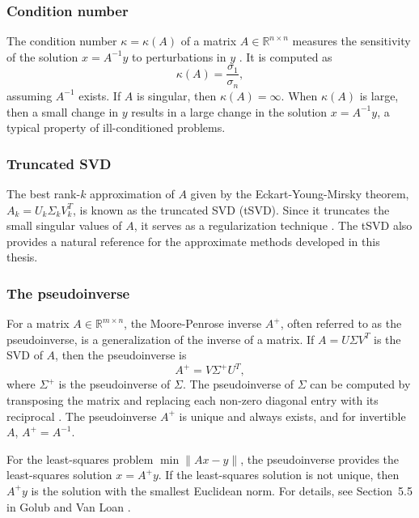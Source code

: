 \subsubsection{Condition number}\label{sec:condition_number}
The condition number $\kappa = \kappa(A)$ of a matrix $A \in \mathbb{R}^{n \times n}$ measures the sensitivity of the solution $x = A^{-1} y$ to perturbations in $y$ \cite{hansen2010discrete}. It is computed as
\begin{equation*}
    \kappa(A) =
    \frac{\sigma_1}{\sigma_n},
\end{equation*}
assuming $A^{-1}$ exists. If $A$ is singular, then $\kappa(A) = \infty$. When $\kappa(A)$ is large, then a small change in $y$ results in a large change in the solution $x = A^{-1} y$, a typical property of ill-conditioned problems.
%


\subsubsection{Truncated SVD}\label{sec:tsvd}
The best rank-$k$ approximation of $A$ given by the Eckart-Young-Mirsky theorem, $A_k = U_k \Sigma_k V_k^T$, is known as the truncated SVD (tSVD). Since it truncates the small singular values of $A$, it serves as a regularization technique \cite{hansen2010discrete}. The tSVD also provides a natural reference for the approximate methods developed in this thesis.


\subsubsection{The pseudoinverse}\label{sec:the_pseudoinverse}
For a matrix $A \in \mathbb{R}^{m \times n}$, the Moore-Penrose inverse $A^+$, often referred to as the pseudoinverse, is a generalization of the inverse of a matrix. If $A = U \Sigma V^T$ is the SVD of $A$, then the pseudoinverse is
\begin{equation}\label{eq:pseudoinverse}
    A^+ = V \Sigma^+ U^T,
\end{equation}
where $\Sigma^+$ is the pseudoinverse of $\Sigma$. The pseudoinverse of $\Sigma$ can be computed by transposing the matrix and replacing each non-zero diagonal entry with its reciprocal \cite{golubMatrixComputations4th2013}. The pseudoinverse $A^+$ is unique and always exists, and for invertible $A$, $A^+ = A^{-1}$.

For the least-squares problem $\min \|Ax - y \|$, the pseudoinverse provides the least-squares solution $x = A^+ y$. If the least-squares solution is not unique, then $A^+ y$ is the solution with the smallest Euclidean norm. For details, see Section~5.5 in Golub and Van Loan \cite{golubMatrixComputations4th2013}.
%


